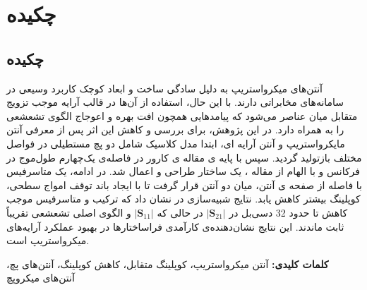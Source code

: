 \chapter*{چکیده}
\thispagestyle{empty}
\section*{چکیده}

آنتن‌های میکرواستریپ به دلیل سادگی ساخت و ابعاد کوچک کاربرد وسیعی در سامانه‌های مخابراتی دارند. با این حال، استفاده از آن‌ها در قالب آرایه موجب تزویج متقابل میان عناصر می‌شود که پیامدهایی همچون افت بهره و اعوجاج الگوی تشعشعی را به همراه دارد. در این پژوهش، برای بررسی و کاهش این اثر پس از معرفی آنتن مایکرواستریپ و آنتن آرایه ای، ابتدا مدل کلاسیک 
\cite{carver1981microstrip}
 شامل دو پچ مستطیلی در فواصل مختلف بازتولید گردید. سپس با پایه ی مقاله ی کارور در فاصله‌ی یک‌چهارم طول‌موج در فرکانس
   و با الهام از مقاله
\cite{hajilou2012mutual}،
     یک ساختار
       طراحی و اعمال شد. در ادامه، یک متاسرفیس با فاصله از صفحه ی آنتن، میان دو آنتن قرار گرفت تا با ایجاد باند توقف امواج سطحی، کوپلینگ بیشتر کاهش یابد. نتایج شبیه‌سازی در 
        نشان داد که ترکیب
          و متاسرفیس موجب کاهش تا حدود 32 دسی‌بل در 
$\vert\bm{S}_{21}\vert$
در حالی که 
$\vert\bm{S}_{11}\vert$
 و الگوی اصلی تشعشعی تقریباً ثابت ماندند. این نتایج نشان‌دهنده‌ی کارآمدی فراساختارها در بهبود عملکرد آرایه‌های میکرواستریپ است.
 
 
\textbf{کلمات کلیدی:}
آنتن میکرواستریپ، کوپلینگ متقابل، کاهش کوپلینگ، آنتن‌های پچ، آنتن‌های میکروپچ


